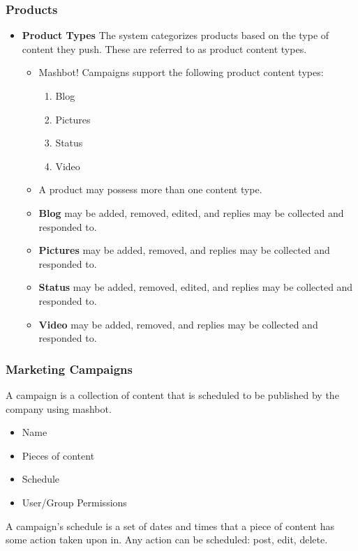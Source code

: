 \documentclass{article}
\begin{document}
		\subsubsection{Products} %
			\begin{itemize}
				\item \textbf{Product Types} The system categorizes products based on the type of content they push.
			 		These are referred to as product content types.
				\begin{itemize}
					\item Mashbot! Campaigns support the following product content types:
						\begin{enumerate}
							\item Blog
							\item Pictures
							\item Status
							\item Video
						\end{enumerate}
					\item A product may possess more than one content type.
					\item \textbf{Blog} may be added, removed, edited, and replies may be collected and responded to. 
					\item \textbf{Pictures} may be added, removed, and replies may be collected and responded to.
					\item \textbf{Status} may be added, removed, edited, and replies may be collected and responded to. 
					\item \textbf{Video} may be added, removed, and replies may be collected and responded to.
				\end{itemize}	
			\end{itemize}
		\subsubsection{Marketing Campaigns} %
                A campaign is a collection of content that is scheduled to be published by the company using mashbot.
                \begin{itemize}
                  \item Name
                  \item Pieces of content
                  \item Schedule
                  \item User/Group Permissions
                \end{itemize}
                A campaign's schedule is a set of dates and times that a piece of content has some action taken upon in.  Any action can be scheduled: post, edit, delete.
                
\end{document}
